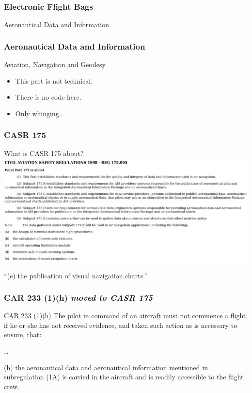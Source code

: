 \begin{frame}
\frametitle{Electronic Flight Bags}
\begin{center}
Aeronautical Data and Information
\end{center}
\end{frame}

\begin{frame}
\frametitle{Aeronautical Data and Information}
\begin{block}{Aviation, Navigation and Geodesy}
\begin{itemize}
\item<1-> This part is not technical.
\item<2-> There is no code here.
\item<3-> Only whinging.
\end{itemize}
\end{block}
\end{frame}

\begin{frame}
\frametitle{CASR 175}
\begin{block}{What is CASR 175 about?}
\includegraphics[height=0.5\textheight]{image/casr175_005.png}
\end{block}
\par
``(e) the publication of visual navigation charts.''
\end{frame}

\begin{frame}
\frametitle{CAR 233 (1)(h) \emph{moved to CASR 175}}
\scriptsize
\begin{block}{CAR 233 (1)(h)}
The pilot in command of an aircraft must not commence a flight if he or she has not received evidence, and taken such action as is necessary to ensure, that:
\par
\ldots
\par
(h)  the aeronautical data and aeronautical information mentioned in subregulation (1A) is carried in the aircraft and is readily accessible to the flight crew.
\end{block}
\par
\end{frame}

